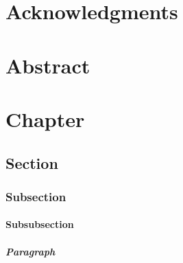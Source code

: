 \documentclass[english,counters by chapter]{uniud}
\begin{document}

\frontmatter

\maketitle

\chapter*{Acknowledgments}

\blindtext

\chapter*{Abstract}

\blindtext

\cleardoublepage

\tableofcontents*


\mainmatter

\chapter{Chapter}
\blindmathtrue

\blindtext

\section{Section}

\blindtext

\subsection{Subsection}

\blindtext

\subsubsection{Subsubsection}

\blindtext

\paragraph{Paragraph}
\end{document}
